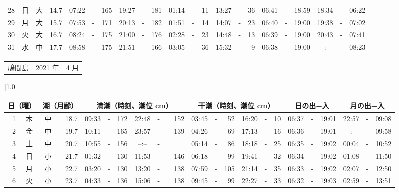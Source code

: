\documentclass[12pt,a4j]{jsarticle}
\begin{document}
\begin{table}[htbp]
\begin{center}
{\begin{tabular}{|rc|cr|ccrccr|ccrccr|ccc|ccc|}
28 & 日 & 大 & 14.7 &  07:22 &-& 165 &  19:27 &-& 181 &  01:14 &-&  11 &  13:27 &-&  36 & 06:41 & -& 18:59 & 18:34 & -& 06:22 \\
29 & 月 & 大 & 15.7 &  07:53 &-& 171 &  20:13 &-& 182 &  01:51 &-&  14 &  14:07 &-&  23 & 06:40 & -& 19:00 & 19:38 & -& 07:02 \\
30 & 火 & 大 & 16.7 &  08:24 &-& 175 &  21:00 &-& 176 &  02:28 &-&  23 &  14:48 &-&  13 & 06:39 & -& 19:00 & 20:43 & -& 07:41 \\
31 & 水 & 中 & 17.7 &  08:58 &-& 175 &  21:51 &-& 166 &  03:05 &-&  36 &  15:32 &-&   9 & 06:38 & -& 19:00 & --:-- & -& 08:23 \\
   \hline
   \end{tabular}}
   \end{center}
\end{table}
\newpage
 \begin{table}[htbp]
 \begin{center}
 \begin{tabular}{lcc}
 \LARGE{鳩間島}  & \large{2021 年} & \large{ 4 月} \\
 \end{tabular}
 \end{center}
 \begin{center}
    \scalebox{0.7}[1.0]{
    \begin{tabular}{|rc|cr|ccrccr|ccrccr|ccc|ccc|}
    \hline
    \multicolumn{2}{|c|}{日（曜）} & \multicolumn{2}{c|}{潮（月齢）} & \multicolumn{6}{c|}{満潮（時刻、潮位 cm）} & \multicolumn{6}{c|}{干潮（時刻、潮位 cm）} & \multicolumn{3}{c|}{日の出−入} &  \multicolumn{3}{c|}{月の出−入}\\
 \hline
 1 & 木 & 中 & 18.7 &  09:33 &-& 172 &  22:48 &-& 152 &  03:45 &-&  52 &  16:20 &-&  10 & 06:37 & -& 19:01 & 22:57 & -& 09:08 \\
 2 & 金 & 中 & 19.7 &  10:11 &-& 165 &  23:57 &-& 139 &  04:26 &-&  69 &  17:13 &-&  16 & 06:36 & -& 19:01 & --:-- & -& 09:58 \\
 3 & 土 & 中 & 20.7 &  10:55 &-& 156 &  --:-- &-&~~~~~ &  05:14 &-&  86 &  18:18 &-&  25 & 06:35 & -& 19:02 & 00:04 & -& 10:52 \\
 4 & 日 & 小 & 21.7 &  01:32 &-& 130 &  11:53 &-& 146 &  06:18 &-&  99 &  19:41 &-&  32 & 06:34 & -& 19:02 & 01:08 & -& 11:50 \\
 5 & 月 & 小 & 22.7 &  03:20 &-& 130 &  13:20 &-& 138 &  07:59 &-& 105 &  21:14 &-&  35 & 06:33 & -& 19:02 & 02:07 & -& 12:50 \\
 6 & 火 & 小 & 23.7 &  04:33 &-& 136 &  15:06 &-& 138 &  09:45 &-&  99 &  22:27 &-&  33 & 06:32 & -& 19:03 & 02:59 & -& 13:51 \\

\end{tabular}}
\end{center}
\end{table}
\end{document}
